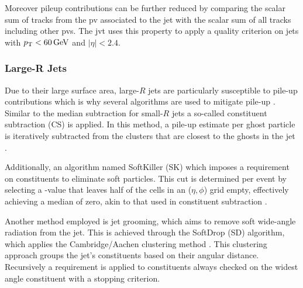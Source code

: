 Moreover pileup contributions can be further reduced by comparing the scalar \pt sum of tracks from the \ac{pv} associated to the jet with the scalar \pt sum of all tracks including other \acp{pv}. The \ac{jvt} \citep{ATLAS-CONF-2014-018} uses this property to apply a quality criterion on jets with $p_{\text{T}}<\qty[]{60}{GeV}$ and $|\eta|<2.4$.


\subsubsection{Large-R Jets}
Due to their large surface area, large-$R$ jets are particularly susceptible to pile-up contributions which is why several algorithms are used to mitigate pile-up \citep{atlas2021optimisation}. Similar to the median \pt subtraction for small-$R$ jets a so-called constituent subtraction (CS) is applied. In this method, a pile-up estimate per ghost particle is iteratively subtracted from the clusters that are closest to the ghosts in the jet \citep{ATLAS-CONF-2017-065}. 

Additionally, an algorithm named SoftKiller (SK) which imposes a \pt requirement on constituents to eliminate soft particles. This \pt cut is determined per event by selecting a \pt-value that leaves half of the cells in an ($\eta,\phi$) grid empty, effectively achieving a median \pt of zero, akin to that used in constituent subtraction \citep{ATLAS-CONF-2017-065}.

Another method employed is jet grooming, which aims to remove soft wide-angle radiation from the jet. This is achieved through the SoftDrop (SD) algorithm, which applies the Cambridge/Aachen clustering method \citep{Larkoski_2014}. This clustering approach groups the jet's constituents based on their angular distance. Recursively a \pt requirement is applied to constituents always checked on the widest angle constituent with a stopping criterion. 






